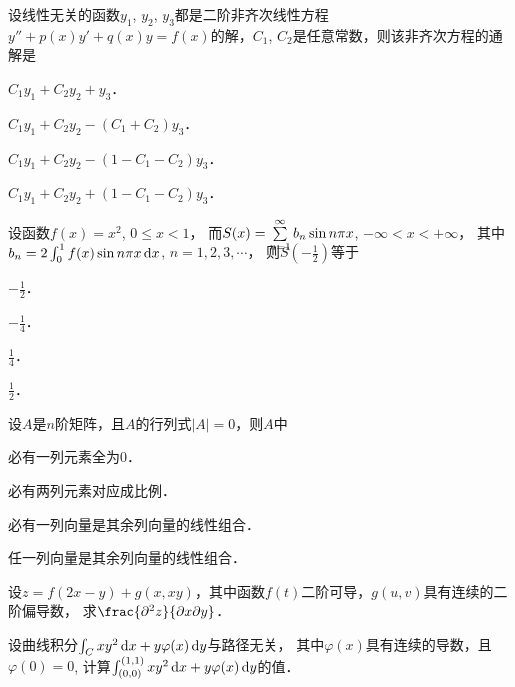 \documentclass[plain,noanswer,medmath]{../../template/jnuexam}
\begin{document}
\begin{problem}
设线性无关的函数$y_1$, $y_2$, $y_3$都是二阶非齐次线性方程
$y''+p(x) y'+q(x)y=f(x)$的解，$C_1$, $C_2$是任意常数，则该非齐次方程的通解是\pickout{}
\begin{abcd}
\item $C_1y_1+C_2y_2+y_3$．
\item $C_1y_1+C_2y_2-(C_1+C_2)y_3$．
\item $C_1y_1+C_2y_2-(1-C_1-C_2)y_3$．
\item $C_1y_1+C_2y_2+(1-C_1-C_2)y_3$．
\end{abcd}
\end{problem}


\begin{problem}
设函数$f(x)=x^2$, $0\le x<1$，
而$\smash[b]{S(x)=\sum_{n=1}^{\infty}b_n\sin n\pi x}$, $-\infty <x<+\infty$，
其中$b_n=2\int_0^1f(x)\sin n\pi x\mathop{}\!\mathrm{d} x$, $n=1,2,3,\cdots$，
则$S\left(-\frac{1}{2}\right)$等于\pickout{}
\begin{abcd}
\item $-\frac{1}{2}$．
\item $-\frac{1}{4}$．
\item $\frac{1}{4}$．
\item $\frac{1}{2}$．
\end{abcd}
\end{problem}


\begin{problem}
设$A$是$n$阶矩阵，且$A$的行列式$|A|=0$，则$A$中\pickout{}
\begin{abcd}
\item 必有一列元素全为$0$．
\item 必有两列元素对应成比例．
\item 必有一列向量是其余列向量的线性组合．
\item 任一列向量是其余列向量的线性组合．
\end{abcd}
\end{problem}




\begin{problem}
设$z=f(2x-y)+g(x,xy)$，其中函数$f(t)$二阶可导，$g(u,v)$具有连续的二阶偏导数，
求$\frac{\pd^2 z}{\pdx\pd y}$．
\end{problem}


\begin{problem}
设曲线积分$\int_C xy^2 \mathop{}\!\mathrm{d} x+y\varphi(x)\mathop{}\!\mathrm{d} y$与路径无关，
其中$\varphi (x)$具有连续的导数，且$\varphi (0)=0$,
计算$\int_{(0,0)}^{(1,1)}xy^2 \mathop{}\!\mathrm{d} x+y\varphi(x)\mathop{}\!\mathrm{d} y$的值．
\end{problem}
\end{document}
